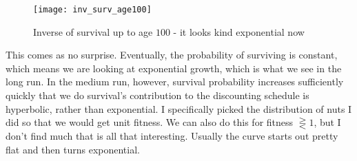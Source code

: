 \begin{figure}[H]
    \centering
    \texttt{[image: inv\_surv\_age100]}
    \caption{Inverse of survival up to age $100$ - it looks kind exponential now}
\end{figure}
This comes as no surprise. Eventually, the probability of surviving is constant, which means we are looking at exponential growth, which is what
we see in the long run. In the medium run, however, survival probability increases sufficiently quickly that we do survival's contribution to the
discounting schedule is hyperbolic, rather than exponential. I specifically picked the distribution of nuts I did so that we would get unit fitness.
We can also do this for fitness $\gtreqless1$, but I don't find much that is all that interesting. Usually the curve starts out pretty flat and then
turns exponential. 










